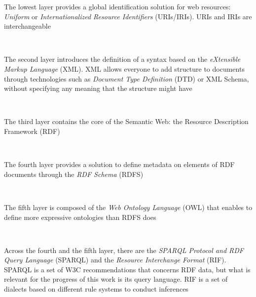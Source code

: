 \documentclass[10pt, a4paper]{report}
\begin{document}
\begin{itemize}
	\begin{minipage}{0.92\textwidth}
		\item The lowest layer provides a global identification solution for web
		resources: \textit{Uniform} or \textit{Internationalized Resource Identifiers} (URIs/IRIs). URIs and IRIs are interchangeable \\
	\end{minipage} \\
	\begin{minipage}{0.92\textwidth}
		\item The second layer introduces the definition of a syntax based on the \textit{eXtensible Markup Language} (XML). XML allows everyone to add structure to documents through technologies such as \textit{Document Type Definition} (DTD) or XML Schema, without specifying any meaning that the structure might have \\
	\end{minipage} \\
	\begin{minipage}{0.92\textwidth}
		\item The third layer contains the core of the Semantic Web: the Resource Description Framework (RDF) \\
	\end{minipage} \\
	\begin{minipage}{0.92\textwidth}
		\item The fourth layer provides a solution to define metadata on elements of RDF documents through the \textit{RDF Schema} (RDFS) \\
	\end{minipage} \\
	\begin{minipage}{0.92\textwidth}
		\item The fifth layer is composed of the \textit{Web Ontology Language} (OWL) that enables to define more expressive ontologies than RDFS does \\
	\end{minipage} \\
	\begin{minipage}{0.92\textwidth}
		\item Across the fourth and the fifth layer, there are the \textit{SPARQL Protocol and RDF Query Language} (SPARQL) and the \textit{Resource Interchange Format} (RIF). SPARQL is a set of W3C recommendations that concerns RDF data, but what is relevant for the progress of this work is its query language. RIF is a set of dialects based on different rule systems to conduct inferences\\
	\end{minipage}
\end{itemize}
\end{document}
